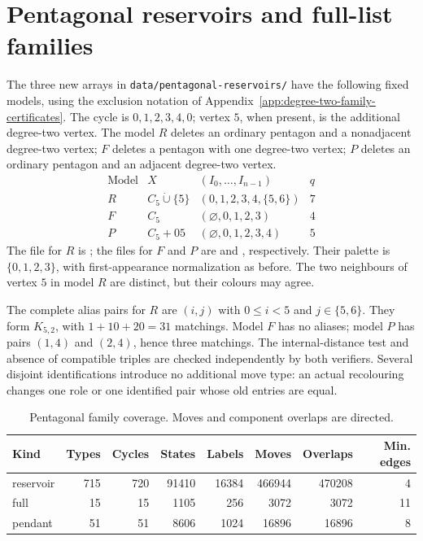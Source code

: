 \documentclass[11pt]{article}
\numberwithin{equation}{section}
\numberwithin{table}{section}
\begin{document}
\section{Pentagonal reservoirs and full-list families}
\label{app:pentagonal-reservoir-certificates}
The three new arrays in \texttt{data/pentagonal-reservoirs/} have the
following fixed models, using the exclusion notation of
Appendix~\ref{app:degree-two-family-certificates}. The cycle is
$0,1,2,3,4,0$; vertex $5$, when present, is the additional degree-two
vertex. The model $R$ deletes an ordinary pentagon and a nonadjacent
degree-two vertex; $F$ deletes a pentagon with one degree-two vertex;
$P$ deletes an ordinary pentagon and an adjacent degree-two vertex.
\[
\begin{array}{cclc}
\text{Model}&X&(I_0,\ldots,I_{n-1})&q\\ \hline
R&C_5\mathbin{\dot\cup}\{5\}&(0,1,2,3,4,\{5,6\})&7\\
F&C_5&(\varnothing,0,1,2,3)&4\\
P&C_5+05&(\varnothing,0,1,2,3,4)&5
\end{array}
\]
The file for $R$ is ; the files for $F$
and $P$ are  and
, respectively. Their palette is $\{0,1,2,3\}$,
with first-appearance normalization as before. The two neighbours of
vertex $5$ in model $R$ are distinct, but their colours may agree.

The complete alias pairs for $R$ are $(i,j)$ with $0\le i<5$ and
$j\in\{5,6\}$. They form $K_{5,2}$, with
$1+10+20=31$ matchings. Model $F$ has no aliases; model $P$ has pairs
$(1,4)$ and $(2,4)$, hence three matchings. The internal-distance test
and absence of compatible triples are checked independently by both
verifiers. Several disjoint identifications introduce no additional move
type: an actual recolouring changes one role or one identified pair
whose old entries are equal.

\begin{table}[htbp]
\centering\small
\caption{Pentagonal family coverage. Moves and component overlaps are directed.}
\label{tab:pentagonal-reservoir-counts}
\begin{tabular}{lrrrrrrr}
\toprule
Kind & Types & Cycles & States & Labels & Moves & Overlaps & Min. edges\\
\midrule
reservoir&715&720&91410&16384&466944&470208&4\\
full&15&15&1105&256&3072&3072&11\\
pendant&51&51&8606&1024&16896&16896&8\\
\bottomrule
\end{tabular}
\end{table}
\end{document}
